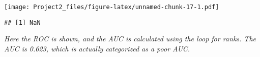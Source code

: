 \documentclass[]{article}
\newenvironment{Shaded}{\begin{snugshade}}{\end{snugshade}}
\newcommand{\ControlFlowTok}[1]{\textcolor[rgb]{0.13,0.29,0.53}{\textbf{#1}}}
\newcommand{\DecValTok}[1]{\textcolor[rgb]{0.00,0.00,0.81}{#1}}
\newcommand{\KeywordTok}[1]{\textcolor[rgb]{0.13,0.29,0.53}{\textbf{#1}}}
\newcommand{\NormalTok}[1]{#1}
\newcommand{\OperatorTok}[1]{\textcolor[rgb]{0.81,0.36,0.00}{\textbf{#1}}}
\begin{document}
\texttt{[image: Project2\_files/figure-latex/unnamed-chunk-17-1.pdf]}

\begin{Shaded}
\end{Shaded}

\begin{verbatim}
## [1] NaN
\end{verbatim}

\emph{Here the ROC is shown, and the AUC is calculated using the loop
for ranks. The AUC is 0.623, which is actually categorized as a poor
AUC.}
\end{document}

